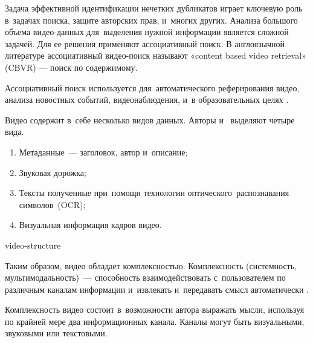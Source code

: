 Задача эффективной идентификации нечетких дубликатов играет ключевую
роль в~задачах поиска, защите авторских прав, и~многих других.
Анализа большого объема видео-данных для~выделения нужной
информации является сложной задачей.
Для ее решения применяют ассоциативный поиск.
В англоязычной литературе ассоциативный видео-поиск называют
«content based video retrieval» (CBVR) —
поиск по содержимому.

Ассоциативный поиск используется для~автоматического
реферирования видео, анализа новостных событий,
видеонаблюдения, и~в образовательных целях \cite{Dimitrova:2002}.

Видео содержит в~себе несколько видов данных.
Авторы \cite{Chung:2007:PAU} и~\cite{smeaton:2006} выделяют четыре вида.
\begin{enumerate}
    \item Метаданные~— заголовок, автор и~описание;
    \item Звуковая дорожка;
    \item Тексты полученные при~помощи технологии
          оптического\
          распознавания символов\
          (OCR);
    \item Визуальная информация кадров видео.
\end{enumerate}


\begin{figuredt}
    {video-structure}
\end{figuredt}

Таким образом, видео обладает комплексностью.
Комплексность (системность, мультимодальность)~— способность взаимодействовать
с~пользователем по различным каналам информации
и~извлекать и~передавать смысл автоматически \cite{Nigay:1993}.

Комплексность видео состоит в~возможности автора выражать мысли,
используя по крайней мере два информационных канала.
Каналы могут быть визуальными, звуковыми или текстовыми.


